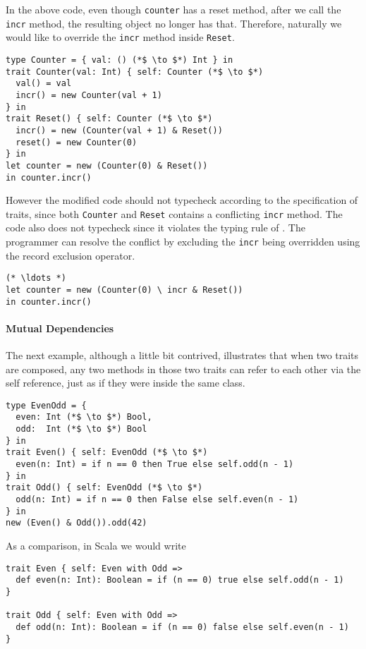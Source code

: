 In the above code, even though \lstinline$counter$ has a reset method, after we
call the \lstinline$incr$ method, the resulting object no longer has that.
Therefore, naturally we would like to override the \lstinline$incr$ method
inside \lstinline$Reset$.

\begin{lstlisting}
type Counter = { val: () (*$ \to $*) Int } in
trait Counter(val: Int) { self: Counter (*$ \to $*)
  val() = val
  incr() = new Counter(val + 1)
} in
trait Reset() { self: Counter (*$ \to $*)
  incr() = new (Counter(val + 1) & Reset())
  reset() = new Counter(0)
} in
let counter = new (Counter(0) & Reset())
in counter.incr()
\end{lstlisting}

However the modified code should not typecheck according to the specification of
traits, since both \lstinline$Counter$ and \lstinline$Reset$ contains a
conflicting \lstinline$incr$ method. The code also does not typecheck since it
violates the typing rule of \name. The programmer can resolve the conflict by
excluding the \lstinline$incr$ being overridden using the record exclusion
operator.

\begin{lstlisting}
(* \ldots *)
let counter = new (Counter(0) \ incr & Reset())
in counter.incr()
\end{lstlisting}

\paragraph{Mutual Dependencies}
The next example, although a little bit contrived, illustrates that when two
traits are composed, any two methods in those two traits can refer to each
other via the self reference, just as if they were inside the same class.

\begin{lstlisting}
type EvenOdd = {
  even: Int (*$ \to $*) Bool,
  odd:  Int (*$ \to $*) Bool
} in
trait Even() { self: EvenOdd (*$ \to $*)
  even(n: Int) = if n == 0 then True else self.odd(n - 1)
} in
trait Odd() { self: EvenOdd (*$ \to $*)
  odd(n: Int) = if n == 0 then False else self.even(n - 1)
} in
new (Even() & Odd()).odd(42)
\end{lstlisting}

As a comparison, in Scala we would write

\begin{lstlisting}
trait Even { self: Even with Odd =>
  def even(n: Int): Boolean = if (n == 0) true else self.odd(n - 1)
}

trait Odd { self: Even with Odd =>
  def odd(n: Int): Boolean = if (n == 0) false else self.even(n - 1)
}
\end{lstlisting}

